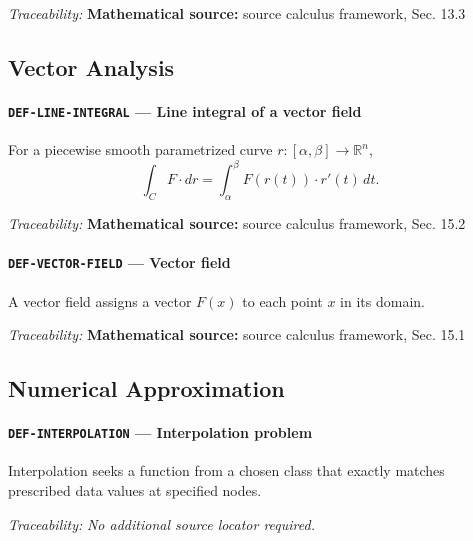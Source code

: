 \documentclass[10pt]{article}
\newcommand{\pidraw}[1]{\begingroup\urlstyle{tt}\nolinkurl{#1}\endgroup}
\theoremstyle{definition}
\theoremstyle{remark}
\begin{document}
\smallskip\noindent\textit{Traceability:} \textbf{Mathematical source:} source calculus framework, Sec. 13.3\par

\subsection{Vector Analysis}

\label{prf:DEF-LINE-INTEGRAL}

\paragraph{\pidraw{DEF-LINE-INTEGRAL} --- Line integral of a vector field}

For a piecewise smooth parametrized curve $r:[\alpha,\beta]\to\mathbb{R}^n$,
 \[
 \int_C F\cdot dr=\int_\alpha^\beta F(r(t))\cdot r'(t)\,dt.
 \]

\smallskip\noindent\textit{Traceability:} \textbf{Mathematical source:} source calculus framework, Sec. 15.2\par

\label{prf:DEF-VECTOR-FIELD}

\paragraph{\pidraw{DEF-VECTOR-FIELD} --- Vector field}

A vector field assigns a vector $F(x)$ to each point $x$ in its domain.

\smallskip\noindent\textit{Traceability:} \textbf{Mathematical source:} source calculus framework, Sec. 15.1\par

\subsection{Numerical Approximation}

\label{prf:DEF-INTERPOLATION}

\paragraph{\pidraw{DEF-INTERPOLATION} --- Interpolation problem}

Interpolation seeks a function from a chosen class that exactly matches prescribed data values at specified nodes.

\smallskip\noindent\textit{Traceability:} \emph{No additional source locator required.}\par
\end{document}
